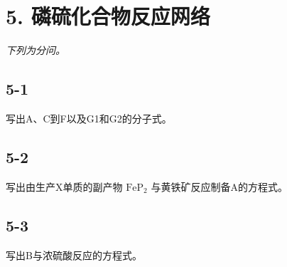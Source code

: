 \section*{5. 磷硫化合物反应网络}
\textit{下列为分问。}

\subsection*{5-1}
写出A、C到F以及G1和G2的分⼦式。

\subsection*{5-2}
写出由⽣产X单质的副产物 $\mathrm { F e P _ { 2 } }$ 与⻩铁矿反应制备A的⽅程式。

\subsection*{5-3}
写出B与浓硫酸反应的⽅程式。
